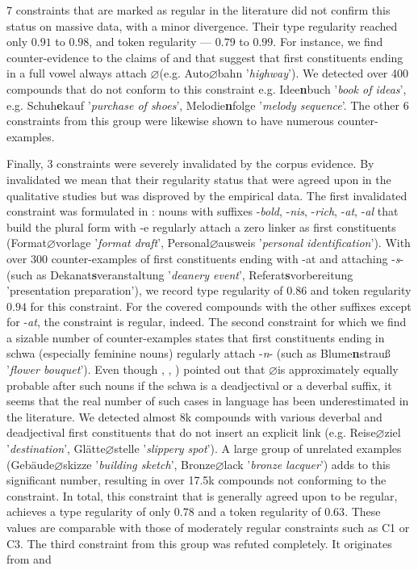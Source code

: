 \documentclass[10pt, a4paper]{article}
\newcommand{\zeroLinker}{\ensuremath{\boldsymbol{\varnothing}}}
\begin{document}
7 constraints that are marked as regular in the literature did not confirm this status on massive data, with a minor divergence. Their type regularity reached only $0.91$ to $0.98$, and token regularity --- $0.79$ to $0.99$. For instance, we find counter-evidence to the claims of \citet[110]{kuerschner_2005} and \citet[9]{schaefer_pankratz_2018} that suggest that first constituents ending in a full vowel always attach \zeroLinker (e.g. Auto{\zeroLinker}bahn '\textit{highway}'). We detected over 400 compounds that do not conform to this constraint e.g. Idee\textbf{n}buch '\textit{book of ideas}', e.g. Schuh\textbf{e}kauf '\textit{purchase of shoes}',  Melodie\textbf{n}folge '\textit{melody sequence}'. The other 6 constraints from this group were likewise shown to have numerous counter-examples.

Finally, 3 constraints were severely invalidated by the corpus evidence. By invalidated we mean that their regularity status that were agreed upon in the qualitative studies but was disproved by the empirical data. The first invalidated constraint was formulated in \citet[107]{ortner_mueller-bollhagen_1991}: nouns with suffixes -\textit{bold}, -\textit{nis}, -\textit{rich}, -\textit{at}, -\textit{al} that build the plural form with -e regularly attach a zero linker as first constituents (Format{\zeroLinker}vorlage '\textit{format draft}', Personal{\zeroLinker}ausweis '\textit{personal identification}'). With over 300 counter-examples of first constituents ending with -at and attaching -\textit{s}- (such as Dekanat\textbf{s}veranstaltung '\textit{deanery event}', Referat\textbf{s}vorbereitung 'presentation preparation'), we record type regularity of $0.86$ and token regularity $0.94$ for this constraint. For the covered compounds with the other suffixes except for -\textit{at}, the constraint is regular, indeed. The second constraint for which we find a sizable number of counter-examples states that first constituents ending in schwa (especially feminine nouns) regularly attach -\textit{n}- (such as Blume\textbf{n}strauß '\textit{flower bouquet}'). Even though \citet[573]{fuhrhop_kuerschner_2015}, \citet[112]{kuerschner_2005}, \citet[93]{ortner_mueller-bollhagen_1991}) pointed out that \zeroLinker is approximately equally probable after such nouns if the schwa is a deadjectival or a deverbal suffix, it seems that the real number of such cases in language has been underestimated in the literature. We detected almost 8k compounds with various deverbal and deadjectival first constituents that do not insert an explicit link (e.g. Reise{\zeroLinker}ziel '\textit{destination}', Glätte{\zeroLinker}stelle '\textit{slippery spot}'). A large group of unrelated examples (Gebäude{\zeroLinker}skizze '\textit{building sketch}', Bronze{\zeroLinker}lack '\textit{bronze lacquer}') adds to this significant number, resulting in over 17.5k compounds not conforming to the constraint. In total, this constraint that is generally agreed upon to be regular, achieves a type regularity of only $0.78$ and a token regularity of $0.63$. These values are comparable with those of moderately regular constraints such as C1 or C3. The third constraint from this group was refuted completely. It originates from \citet[77]{nuebling_szczepaniak_2013} and 
\end{document}
